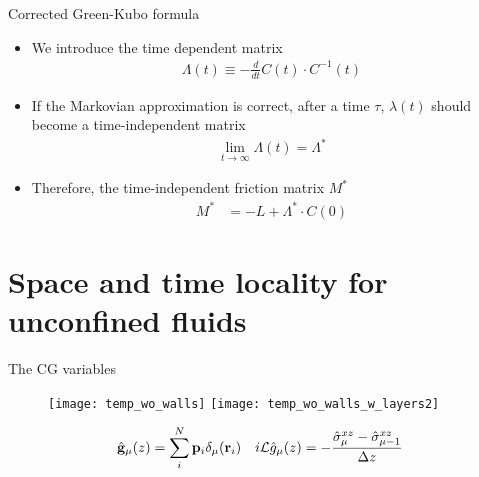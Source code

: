 \documentclass{beamer}
\newcommand{\esc}{\!\cdot\!}
\begin{document}
\begin{frame}{Corrected Green-Kubo formula}
  \begin{itemize}
\item We introduce the time dependent matrix 
\begin{align}
\Lambda(t)\equiv-    \frac{d}{dt}C(t)\esc C^{-1}(t)
\nonumber
\end{align}
\item If the Markovian approximation is correct, after a time $\tau$, $\lambda(t)$ should become a time-independent matrix 
\begin{align}
  \lim_{t\to \infty}\Lambda(t)=\Lambda^*
\nonumber
\end{align}
\item Therefore, the time-independent friction matrix $M^*$
\begin{align}
M^*&=  -L+ \Lambda^*\esc C(0)
\nonumber
\end{align}
\end{itemize}
\end{frame}

\section{Space and time locality for unconfined fluids}
\begin{frame}{The CG variables}
\begin{figure}
    \centering
    \texttt{[image: temp\_wo\_walls]}
    \texttt{[image: temp\_wo\_walls\_w\_layers2]}
\end{figure}
\begin{align}
  \hat{\bf g}_\mu(z)= \sum_i^N{\bf p}_i\delta_\mu({\bf r}_i)&& 
  i{\cal L}  \hat{g}_{\mu}(z)=-\frac{\hat{\sigma}^{xz}_{\mu}-\hat{\sigma}^{xz}_{\mu-1}}{\Delta z}
\nonumber
\end{align}
\nonumber
\end{frame}
\end{document}
